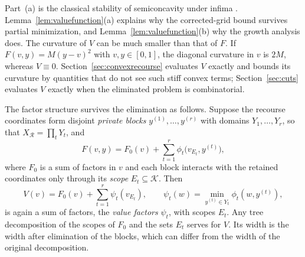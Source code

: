 Part~(a) is the classical stability of semiconcavity under infima
\cite{CannarsaSinestrari2004}. Lemma~\ref{lem:valuefunction}(a) explains why
the corrected-grid bound survives partial minimization, and
Lemma~\ref{lem:valuefunction}(b) why the growth analysis does. The curvature
of $V$ can be much smaller than that of $F$. If $F(v,y)=M(y-v)^2$ with
$v,y\in[0,1]$, the diagonal curvature in $v$ is $2M$, whereas $V\equiv0$.
Section~\ref{sec:convexrecourse} evaluates $V$ exactly and bounds its
curvature by quantities that do not see such stiff convex terms;
Section~\ref{sec:cuts} evaluates $V$ exactly when the eliminated problem is
combinatorial.

The factor structure survives the elimination as follows. Suppose the
recourse coordinates form disjoint \emph{private blocks}
$y^{(1)},\dots,y^{(r)}$ with domains $Y_1,\dots,Y_r$, so that
$X_{\mathcal R}=\prod_tY_t$, and
\begin{equation}\label{eq:privateblocks}
F(v,y)=F_0(v)+\sum_{t=1}^r\phi_t\bigl(v_{E_t},y^{(t)}\bigr),
\end{equation}
where $F_0$ is a sum of factors in $v$ and each block interacts with the
retained coordinates only through its \emph{scope} $E_t\subseteq\mathcal K$.
Then
\[
V(v)=F_0(v)+\sum_{t=1}^r\psi_t(v_{E_t}),\qquad
\psi_t(w)=\min_{y^{(t)}\in Y_t}\phi_t(w,y^{(t)}),
\]
is again a sum of factors, the \emph{value factors} $\psi_t$, with scopes
$E_t$. Any tree decomposition of the scopes of $F_0$ and the sets $E_t$
serves for $V$. Its width is the width after elimination of the blocks,
which can differ from the width of the original decomposition.

